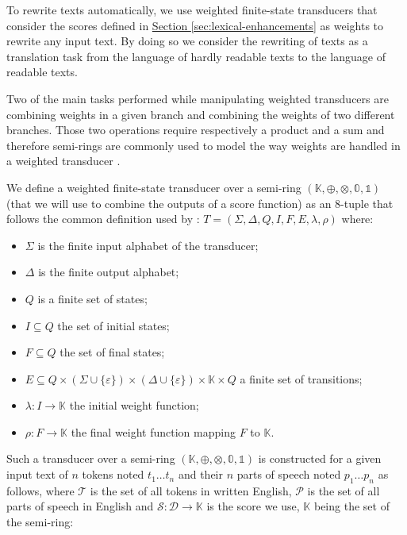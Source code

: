 \documentclass[a4paper, 11pt, onepage]{scrreprt}
\newcommand\sectionref[1]{\hyperref[#1]{Section \ref*{#1}}}
\begin{document}
To rewrite texts automatically, we use weighted finite-state
transducers that consider the scores defined
in \sectionref{sec:lexical-enhancements} as weights to rewrite any
input text. By doing so we consider the rewriting of texts as a
translation task from the language of hardly readable texts to the
language of readable texts.

Two of the main tasks performed while manipulating weighted
transducers are combining weights in a given branch and combining the
weights of two different branches. Those two operations require
respectively a product and a sum and therefore semi-rings are commonly
used to model the way weights are handled in a weighted transducer
\cite{mohri2004weighted}.

We define a weighted finite-state transducer over a semi-ring
$(\mathbb{K}, \oplus, \otimes, \mathbb{0}, \mathbb{1})$ (that we will
use to combine the outputs of a score function) as an 8-tuple that
follows the common definition used by \cite{mohri2004weighted}: $T =
(\Sigma, \Delta, Q, I, F, E, \lambda, \rho)$ where:
\begin{itemize}
\item $\Sigma$ is the finite input alphabet of the transducer;
\item $\Delta$ is the finite output alphabet;
\item $Q$ is a finite set of states;
\item $I \subseteq Q$ the set of initial states;
\item $F \subseteq Q$ the set of final states;
\item $E \subseteq Q \times (\Sigma \cup \{\varepsilon\}) \times
  (\Delta \cup \{\varepsilon\}) \times \mathbb{K} \times Q$ a finite
  set of transitions;
\item $\lambda : I \rightarrow \mathbb{K}$ the initial weight function;
\item $\rho : F \rightarrow \mathbb{K}$ the final weight function mapping
  $F$ to $\mathbb{K}$.
\end{itemize}
Such a transducer over a semi-ring $(\mathbb{K}, \oplus, \otimes,
\mathbb{0}, \mathbb{1})$ is constructed for a given input text of $n$
tokens noted $t_1 \dots t_n$ and their $n$ parts of speech noted $p_1
\dots p_n$ as follows, where $\mathcal{T}$ is the set of all tokens in
written English, $\mathcal{P}$ is the set of all parts of speech in
English and $\mathcal{S} : \mathcal{D} \rightarrow \mathbb{K}$ is the
score we use, $\mathbb{K}$ being the set of the semi-ring:
\end{document}
